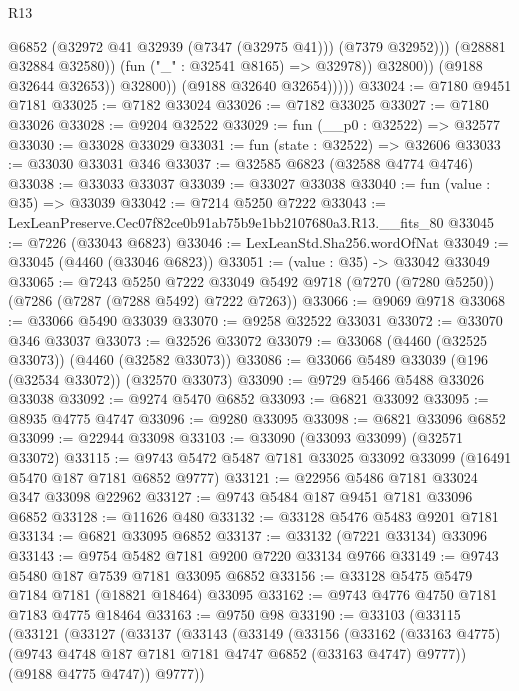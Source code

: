 \begin{lexlean}{R13}
\begin{coremodule}
                              @6852
                              (@32972 @41 @32939 (@7347 (@32975 @41)))
                              (@7379 @32952)))
                          (@28881 @32884 @32580))
                        (fun ("_" : @32541 @8165) => @32978))
                      @32800))
                  (@9188 @32644 @32653))
                @32800))
            (@9188 @32640 @32654)))))
@33024 := @7180 @9451 @7181
@33025 := @7182 @33024
@33026 := @7182 @33025
@33027 := @7180 @33026
@33028 := @9204 @32522
@33029 := fun (__p0 : @32522) => @32577
@33030 := @33028 @33029
@33031 := fun (state : @32522) => @32606
@33033 := @33030 @33031 @346
@33037 := @32585 @6823 (@32588 @4774 @4746)
@33038 := @33033 @33037
@33039 := @33027 @33038
@33040 := fun (value : @35) => @33039
@33042 := @7214 @5250 @7222
@33043 := LexLeanPreserve.Cec07f82ce0b91ab75b9e1bb2107680a3.R13.__fits_80
@33045 := @7226 (@33043 @6823)
@33046 := LexLeanStd.Sha256.wordOfNat
@33049 := @33045 (@4460 (@33046 @6823))
@33051 := (value : @35) -> @33042 @33049
@33065 := @7243
    @5250
    @7222
    @33049
    @5492
    @9718
    (@7270 (@7280 @5250))
    (@7286 (@7287 (@7288 @5492) @7222 @7263))
@33066 := @9069 @9718
@33068 := @33066 @5490 @33039
@33070 := @9258 @32522 @33031
@33072 := @33070 @346 @33037
@33073 := @32526 @33072
@33079 := @33068 (@4460 (@32525 @33073)) (@4460 (@32582 @33073))
@33086 := @33066 @5489 @33039 (@196 (@32534 @33072)) (@32570 @33073)
@33090 := @9729 @5466 @5488 @33026 @33038
@33092 := @9274 @5470 @6852
@33093 := @6821 @33092
@33095 := @8935 @4775 @4747
@33096 := @9280 @33095
@33098 := @6821 @33096 @6852
@33099 := @22944 @33098
@33103 := @33090 (@33093 @33099) (@32571 @33072)
@33115 := @9743 @5472 @5487 @7181 @33025 @33092 @33099 (@16491 @5470 @187 @7181 @6852 @9777)
@33121 := @22956 @5486 @7181 @33024 @347 @33098 @22962
@33127 := @9743 @5484 @187 @9451 @7181 @33096 @6852
@33128 := @11626 @480
@33132 := @33128 @5476 @5483 @9201 @7181
@33134 := @6821 @33095 @6852
@33137 := @33132 (@7221 @33134) @33096
@33143 := @9754 @5482 @7181 @9200 @7220 @33134 @9766
@33149 := @9743 @5480 @187 @7539 @7181 @33095 @6852
@33156 := @33128 @5475 @5479 @7184 @7181 (@18821 @18464) @33095
@33162 := @9743 @4776 @4750 @7181 @7183 @4775 @18464
@33163 := @9750 @98
@33190 := @33103
    (@33115
      (@33121
        (@33127
          (@33137
            (@33143
              (@33149
                (@33156
                  (@33162
                    (@33163 @4775)
                    (@9743 @4748 @187 @7181 @7181 @4747 @6852 (@33163 @4747) @9777))
                  (@9188 @4775 @4747))
                @9777))

\end{coremodule}
\end{lexlean}
